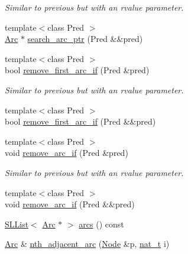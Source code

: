\begin{DoxyCompactItemize}
\begin{DoxyCompactList}\small\item\em Similar to previous but with an rvalue parameter. \end{DoxyCompactList}\item 
{\footnotesize template$<$class Pred $>$ }\\\hyperlink{namespace_designar_a3f55fb5513d62ff47cbc8f72b8e95d6f}{Arc} $\ast$ \hyperlink{class_designar_1_1_base_graph_a4ffe61f2548a892d070aa46609c4532c}{search\+\_\+arc\+\_\+ptr} (Pred \&\&pred)
\item 
{\footnotesize template$<$class Pred $>$ }\\bool \hyperlink{class_designar_1_1_base_graph_ae45255ef62c056e76c5e5c45182e9490}{remove\+\_\+first\+\_\+arc\+\_\+if} (Pred \&pred)
\begin{DoxyCompactList}\small\item\em Similar to previous but with an rvalue parameter. \end{DoxyCompactList}\item 
{\footnotesize template$<$class Pred $>$ }\\bool \hyperlink{class_designar_1_1_base_graph_a990426c9e87f922bbbd0c9bc4d2cedd8}{remove\+\_\+first\+\_\+arc\+\_\+if} (Pred \&\&pred)
\item 
{\footnotesize template$<$class Pred $>$ }\\void \hyperlink{class_designar_1_1_base_graph_a9c97f2759a2847e61e17dc2806172758}{remove\+\_\+arc\+\_\+if} (Pred \&pred)
\begin{DoxyCompactList}\small\item\em Similar to previous but with an rvalue parameter. \end{DoxyCompactList}\item 
{\footnotesize template$<$class Pred $>$ }\\void \hyperlink{class_designar_1_1_base_graph_a0e516bee6e0247de6bdd207de57caad6}{remove\+\_\+arc\+\_\+if} (Pred \&\&pred)
\item 
\hyperlink{class_designar_1_1_s_l_list}{S\+L\+List}$<$ \hyperlink{namespace_designar_a3f55fb5513d62ff47cbc8f72b8e95d6f}{Arc} $\ast$ $>$ \hyperlink{class_designar_1_1_base_graph_af9d306a0474e8e3b38b7bd697b844d11}{arcs} () const
\item 
\hyperlink{namespace_designar_a3f55fb5513d62ff47cbc8f72b8e95d6f}{Arc} \& \hyperlink{class_designar_1_1_base_graph_aa0047160fb8424fe88dc7c1785f66827}{nth\+\_\+adjacent\+\_\+arc} (\hyperlink{namespace_designar_a5af326c65aa2bd26b26c410f2030d09e}{Node} \&p, \hyperlink{namespace_designar_aa72662848b9f4815e7bf31a7cf3e33d1}{nat\+\_\+t} i)

\end{DoxyCompactItemize}
